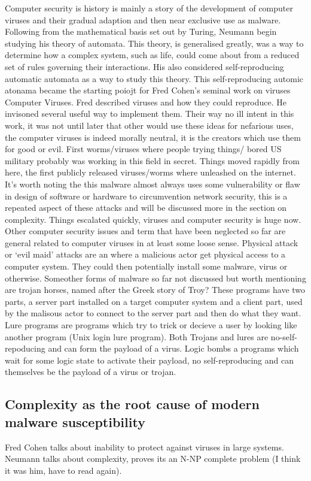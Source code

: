 Computer security is history is mainly a story of the development of computer viruses and their gradual adaption and then near exclusive use as malware. Following from the mathematical basis set out by Turing, Neumann begin studying his theory of automata. This theory, is generalised greatly, was a way to determine how a complex system, such as life, could come about from a reduced set of rules governing their interactions. His also considered self-reproducing automatic automata as a way to study this theory. This self-reproducing automic atonama became the starting poiojt for Fred Cohen's seminal work on viruses Computer Viruses. Fred described viruses and how they could reproduce. He invisoned several useful way to implement them. Their way no ill intent in this work, it was not until later that other would use these ideas for nefarious uses, the computer viruses is indeed morally neutral, it is the creators which use them for good or evil. 
First worms/viruses where people trying things/ bored
US military probably was working in this field in secret. 
Things moved rapidly from here, the first publicly released viruses/worms where unleashed on the internet. It’s worth noting the this malware almost always uses some vulnerability or flaw in design of software or hardware to circumvention network security, this is a repeated aspect of these attacks and will be discussed more in the section on complexity. Things escalated quickly, viruses and computer security is huge now.
Other computer security issues and term that have been neglected so far are general related to computer viruses in at least some loose sense. Physical attack or ‘evil maid’ attacks are an where a malicious actor get physical access to a computer system. They could then potentially install some malware, virus or otherwise. Someother forms of malware so far not discussed but worth mentioning are trojan horses, named after the Greek story of Troy? These programs have two parts, a server part installed on a target computer system and a client part, used by the malisous actor to connect to the server part and then do what they want. Lure programs are programs which try to trick or decieve a user by looking like another program (Unix login lure program). Both Trojans and lures are no-self-repoducing and can form the payload of a virus. Logic bombs a programs which wait for some logic state to activate their payload, no self-reproducing and can themselves be the payload of a virus or trojan.


\subsection{Complexity as the root cause of modern malware susceptibility}
Fred Cohen talks about inability to protect against viruses in large systems.
Neumann talks about complexity, proves its an N-NP complete problem (I think it was him, have to read again).

